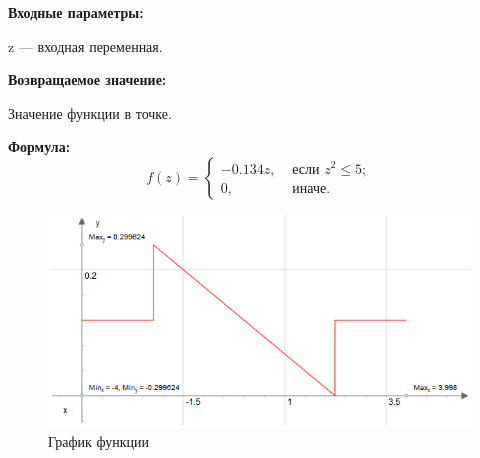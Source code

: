 \textbf{Входные параметры:}
 
z --- входная переменная.

\textbf{Возвращаемое значение:}
 
Значение функции в точке.

\textbf{Формула:}
\begin{equation*}
f\left(z \right)=\left\lbrace \begin{aligned} -0.134z,& \text{ если } z^2\leq 5 ; \\ 0,& \text{ иначе}. \end{aligned}\right.
\end{equation*}

 \begin{figure} [h] 
   \center
   \includegraphics {HML_DerivativeOfBellShapedKernelParabola_Graph.png}
   \caption{График функции} 
   \label{img:HML_DerivativeOfBellShapedKernelParabola_Graph}  
 \end{figure}